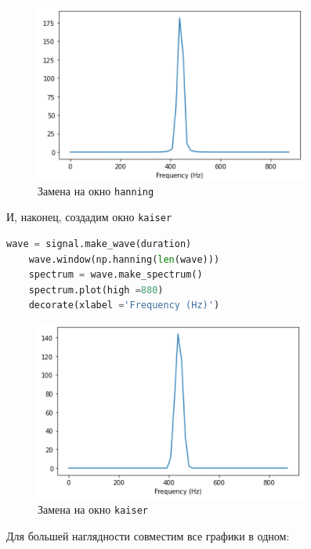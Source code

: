 \documentclass[a4paper]{article}
\begin{document}
            \begin{figure}[H]
                \centering
                \includegraphics{ex_1_hanning.png}
                \caption{Замена на окно \texttt{hanning}}
                \label{fig:ex_1_blackman}
            \end{figure}
            
            И, наконец, создадим окно \texttt{kaiser}
            
\begin{lstlisting}[language=Python, caption= Окно \texttt{kaiser}]
    wave = signal.make_wave(duration)
    wave.window(np.hanning(len(wave)))
    spectrum = wave.make_spectrum()
    spectrum.plot(high =880)
    decorate(xlabel ='Frequency (Hz)')
\end{lstlisting}               
            
            \begin{figure}[H]
                \centering
                \includegraphics{ex_1_kraiser.png}
                \caption{Замена на окно \texttt{kaiser}}
                \label{fig:ex_1_kraiser}
            \end{figure}
            
            Для большей наглядности совместим все графики в одном:
            
\end{document}
